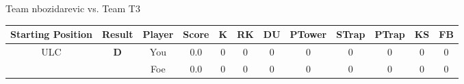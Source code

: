 \documentclass[a4paper,12pt]{article}
\begin{document}
\begin{tabular}[t]{| c | c | c | c | c | c | c | c | c | c | c | c
      |}
                      
      
                      
      
                      
      
                      
                        \hline
                      \end{tabular}
                      
  \vspace*{2em}
  \par {\large {\color{Gray} Team} nbozidarevic {\color{Gray}
      vs. Team} T3}
  \newline
  \begin{tabular}[t]{| c | c | c | c | c | c | c | c | c | c | c | c
      |}
    \hline
    Starting Position & \textbf{Result} & Player & \textbf{Score} & K & RK & DU & PTower & STrap & PTrap & KS & FB \\
    
      
                      
      
                      
      
                      
      
                      
      
                      
      
                      
      
                      
      
                      
      
                      
      
                      
      
                      
      
                      
      
        \hline
        \multirow{2}{*}{  ULC  } &
              \multirow{2}{*}{  
                  \textbf{D}  } & 
                    \cellcolor{yellow!25} You & \cellcolor{yellow!25} 0.0 & \cellcolor{yellow!25} 0 &
                    \cellcolor{yellow!25} 0 & \cellcolor{yellow!25} 0 & \cellcolor{yellow!25} 0 &
                    \cellcolor{yellow!25} 0 & \cellcolor{yellow!25} 0 & \cellcolor{yellow!25} 0 &
                    \cellcolor{yellow!25} 0 \\
                    \cline{3-12}
                    & & \cellcolor{red!15} Foe & \cellcolor{red!15} 0.0 & \cellcolor{red!15} 0 & \cellcolor{red!15}
                    0 & \cellcolor{red!15} 0
                    & \cellcolor{red!15} 0 & \cellcolor{red!15}
                    0 & \cellcolor{red!15} 0 
                    & \cellcolor{red!15} 0 & \cellcolor{red!15}
                    0 \\
                    

\end{tabular}
\end{document}
